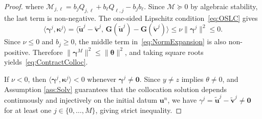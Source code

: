 \documentclass[10pt,a4paper]{amsart}
\begin{document}
\begin{proof}
    where $\mathcal{M}_{j,\ell} 
    = b_j Q_{j,\ell} + b_\ell Q_{\ell,j} - b_j b_\ell$.
    Since $\mathcal{M}\succcurlyeq 0$ by algebraic 
    stability, the last term is non-negative. The 
    one-sided Lipschitz condition~\eqref{eq:OSLC} gives
    \[
        \langle\bm{\gamma}^j,\bm{\kappa}^j\rangle
        = \langle\tilde{\bm{u}}^j - \tilde{\bm{v}}^j,\,
                  \bm{G}(\tilde{\bm{u}}^j)
                  - \bm{G}(\tilde{\bm{v}}^j)\rangle
        \leq \nu\|\bm{\gamma}^j\|^2 \leq 0.
    \]
    Since $\nu\leq 0$ and $b_j\geq 0$, the middle term 
    in~\eqref{eq:NormExpansion} is also non-positive. 
    Therefore $\|\bm{\gamma}^M\|^2 \leq \|\bm{\theta}\|^2$, 
    and taking square roots yields~\eqref{eq:ContractColloc}.
    
    If $\nu<0$, then $\langle\bm{\gamma}^j,\bm{\kappa}^j\rangle < 0$ whenever $\bm{\gamma}^j\neq\bm{0}$. Since $y \neq z$ implies $\theta \neq 0$, and Assumption \ref{ass:Solv} guarantees that the collocation 
solution depends continuously and injectively on 
the initial datum $\bm{u}^n$, we have 
$\gamma^j = \tilde{\bm{u}}^j - \tilde{\bm{v}}^j 
\neq \bm{0}$ for at least one $j\in\{0,\dots,M\}$, 
giving strict inequality.
\end{proof}
\end{document}
